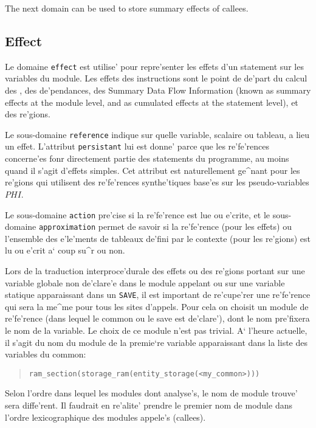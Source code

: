 
The next domain can be used to store summary effects of callees.

{}

\subsection{Effect}
\label{subsection-effect}

{}

Le domaine \verb/effect/ est utilise' pour repre'senter les effets d'un
statement sur les variables du module. Les effets des instructions sont
le point de de'part du calcul des  , des
de'pendances, des Summary Data Flow Information (known as summary
effects at the module level, and as cumulated effects at the statement
level), et des re'gions.

Le sous-domaine {\tt reference} indique sur quelle variable, scalaire ou
tableau, a lieu un effet. L'attribut {\tt persistant} lui est donne'
parce que les re'fe'rences concerne'es fonr directement partie des
statements du programme, au moins quand il s'agit d'effets simples. Cet
attribut est naturellement ge^nant pour les re'gions qui utilisent des
re'fe'rences synthe'tiques base'es sur les pseudo-variables $PHI$.

Le sous-domaine {\tt action} pre'cise si la
re'fe'rence est lue ou e'crite, et le sous-domaine {\tt approximation}
permet de savoir si la re'fe'rence (pour les effets) ou l'ensemble des
e'le'ments de tableaux de'fini par le contexte (pour les re'gions) est lu ou
e'crit a` coup su^r ou non. 

Lors de la traduction interproce'durale des effets ou des re'gions portant
sur une variable globale non de'clare'e dans le module appelant ou sur une
variable statique apparaissant dans un {\tt SAVE}, il est important de
re'cupe'rer une re'fe'rence qui sera la me^me pour tous les sites d'appels.
Pour cela on choisit un module de re'fe'rence (dans lequel le common ou le
save est de'clare'), dont le nom pre'fixera le nom de la variable. Le choix
de ce module n'est pas trivial. A` l'heure actuelle, il s'agit du nom du
module de la premie`re variable apparaissant dans la liste des variables du
common:
\begin{quote}
 {\tt ram\_section(storage\_ram(entity\_storage(<my\_common>)))}
\end{quote}
Selon l'ordre dans lequel les modules dont analyse's, le nom de module
trouve' sera diffe'rent. Il faudrait en re'alite' prendre le premier nom
de module dans l'ordre lexicographique des modules appele's (callees).

